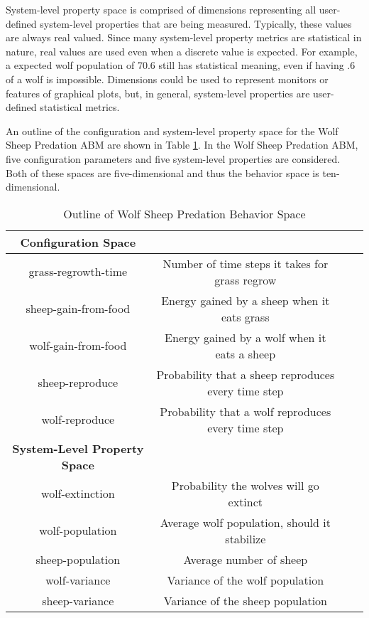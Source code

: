 System-level property space is comprised of dimensions representing all user-defined system-level properties that are being measured.
Typically, these values are always real valued.
Since many system-level property metrics are statistical in nature, real values are used even when a discrete value is expected.
For example, a expected wolf population of 70.6 still has statistical meaning, even if having .6 of a wolf is impossible.
Dimensions could be used to represent monitors or features of graphical plots, but, in general, system-level properties are user-defined statistical metrics.

An outline of the configuration and system-level property space for the Wolf Sheep Predation ABM are shown in Table \ref{table:ws_parameters}.
In the Wolf Sheep Predation ABM, five configuration parameters and five system-level properties are considered.
Both of these spaces are five-dimensional and thus the behavior space is ten-dimensional.

\begin{table}[ht]
  \caption{Outline of Wolf Sheep Predation Behavior Space}
  \centering
  \begin{tabular}{c c c c}
    \hline \hline
    \textbf{Configuration Space} \\
    \hline
    grass-regrowth-time & Number of time steps it takes for grass regrow \\
    sheep-gain-from-food & Energy gained by a sheep when it eats grass \\ 
    wolf-gain-from-food & Energy gained by a wolf when it eats a sheep \\
    sheep-reproduce & Probability that a sheep reproduces every time step \\
    wolf-reproduce & Probability that a wolf reproduces every time step\\
    \hline \hline
    \textbf{System-Level Property Space} \\
    \hline
    wolf-extinction & Probability the wolves will go extinct \\
    wolf-population & Average wolf population, should it stabilize \\
    sheep-population & Average number of sheep \\
    wolf-variance & Variance of the wolf population \\
    sheep-variance & Variance of the sheep population \\
    \hline


  \end{tabular}
  \label{table:ws_parameters}
\end{table}



